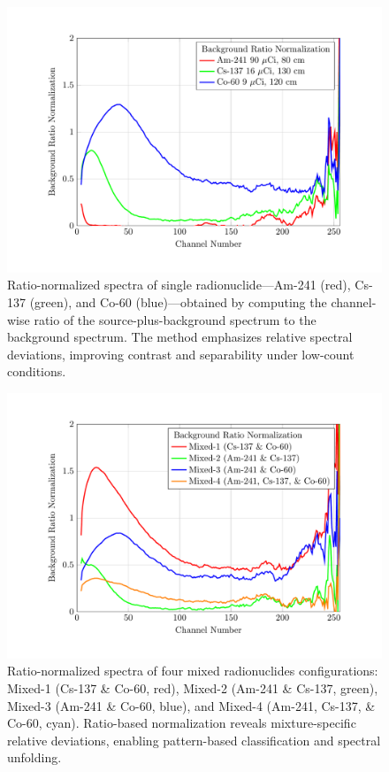 \documentclass[10pt]{wlscirep}
\begin{document}
\begin{figure}[ht]
\centering
\includegraphics[width=\linewidth]{figure/fig05_CSRN.pdf}
\caption{ Ratio-normalized spectra of single radionuclide—Am-241 (red), Cs-137 (green), and Co-60 (blue)—obtained by computing the channel-wise ratio of the source-plus-background spectrum to the background spectrum. The method emphasizes relative spectral deviations, improving contrast and separability under low-count conditions.}
\label{fig:csbs}
\end{figure}

\begin{figure}[ht]
\centering
\includegraphics[width=\linewidth]{figure/fig06_CSBRS.pdf}
\caption{Ratio-normalized spectra of four mixed radionuclides configurations: Mixed-1 (Cs-137 \& Co-60, red), Mixed-2 (Am-241 \& Cs-137, green), Mixed-3 (Am-241 \& Co-60, blue), and Mixed-4 (Am-241, Cs-137, \& Co-60, cyan). Ratio-based normalization reveals mixture-specific relative deviations, enabling pattern-based classification and spectral unfolding.}
\label{fig:fi_CSBRS}
\end{figure}
\end{document}
